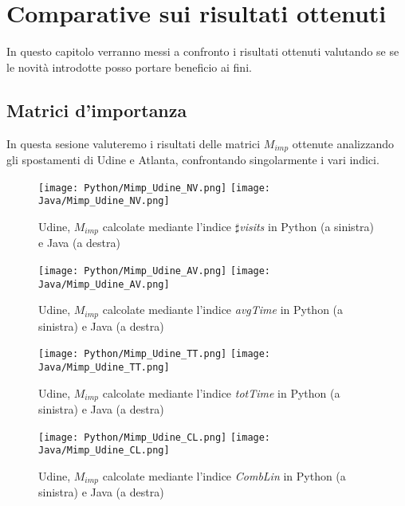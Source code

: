 \chapter{Comparative sui risultati ottenuti}
In questo capitolo verranno messi a confronto i risultati ottenuti valutando
se se le novit\`a introdotte posso portare beneficio ai fini.
\section{Matrici d'importanza}
In questa sesione valuteremo i risultati delle matrici $M_{imp}$ ottenute analizzando
gli spostamenti di Udine e Atlanta, confrontando singolarmente i vari indici.

\begin{figure}[h]
    \begin{center}
    \texttt{[image: Python/Mimp\_Udine\_NV.png]}
    \texttt{[image: Java/Mimp\_Udine\_NV.png]}
    \caption[UD_NV]{
        Udine, $M_{imp}$ calcolate mediante l'indice $\sharp$\textit{visits}
        in Python (a sinistra) e Java (a destra)
    }
    \label{etichetta}
    \end{center}
\end{figure}

\begin{figure}[h]
    \begin{center}
    \texttt{[image: Python/Mimp\_Udine\_AV.png]}
    \texttt{[image: Java/Mimp\_Udine\_AV.png]}
    \caption[UD_AV]{
        Udine, $M_{imp}$ calcolate mediante l'indice \textit{avgTime}
        in Python (a sinistra) e Java (a destra)
    }
    \label{etichetta}
    \end{center}
\end{figure}

\begin{figure}[h]
    \begin{center}
    \texttt{[image: Python/Mimp\_Udine\_TT.png]}
    \texttt{[image: Java/Mimp\_Udine\_TT.png]}
    \caption[UD_TT]{
        Udine, $M_{imp}$ calcolate mediante l'indice \textit{totTime}
        in Python (a sinistra) e Java (a destra)
    }
    \label{etichetta}
    \end{center}
\end{figure}

\begin{figure}[h]
    \begin{center}
    \texttt{[image: Python/Mimp\_Udine\_CL.png]}
    \texttt{[image: Java/Mimp\_Udine\_CL.png]}
    \caption[UD_CL]{
        Udine, $M_{imp}$ calcolate mediante l'indice \textit{CombLin}
        in Python (a sinistra) e Java (a destra)
    }
    \label{etichetta}
    \end{center}
\end{figure}

